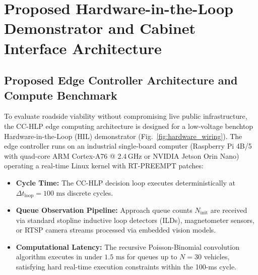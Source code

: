 \documentclass[journal,10pt,twocolumn]{IEEEtran}
\begin{document}
\section{Proposed Hardware-in-the-Loop Demonstrator and Cabinet Interface Architecture}
\label{sec:hardware_interfacing}

\subsection{Proposed Edge Controller Architecture and Compute Benchmark}
To evaluate roadside viability without compromising live public infrastructure, the CC-HLP edge computing architecture is designed for a low-voltage benchtop Hardware-in-the-Loop (HIL) demonstrator (Fig.~\ref{fig:hardware_wiring}). The edge controller runs on an industrial single-board computer (Raspberry Pi 4B/5 with quad-core ARM Cortex-A76 @ 2.4\,GHz or NVIDIA Jetson Orin Nano) operating a real-time Linux kernel with RT-PREEMPT patches:
\begin{itemize}
    \item \textbf{Cycle Time:} The CC-HLP decision loop executes deterministically at $\Delta t_{\text{loop}} = 100\text{ ms}$ discrete cycles.
    \item \textbf{Queue Observation Pipeline:} Approach queue counts $N_{\text{init}}$ are received via standard stopline inductive loop detectors (ILDs), magnetometer sensors, or RTSP camera streams processed via embedded vision models.
    \item \textbf{Computational Latency:} The recursive Poisson-Binomial convolution algorithm executes in under $1.5\text{ ms}$ for queues up to $N = 30$ vehicles, satisfying hard real-time execution constraints within the 100-ms cycle.
\end{itemize}
\end{document}
